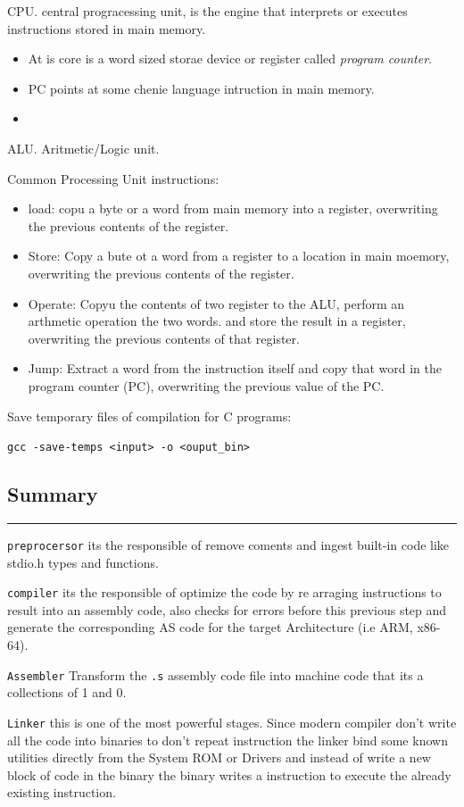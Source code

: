 CPU. central progracessing unit, is the engine that interprets or executes instructions stored in main memory.
\begin{itemize}
  \item At is core is a word sized storae device or register called \textit{program counter}.
  \item PC points at some chenie language intruction in main memory.
  \item 

\end{itemize}
ALU. Aritmetic/Logic unit.

Common Processing Unit instructions:
\begin{itemize}
  \item load: copu a byte or a word from main memory into a register, overwriting the previous contents of the register.
  \item Store: Copy a bute ot a word from a register to a location in main moemory, overwriting the previous contents of the register.
  \item Operate: Copyu the contents of two register to the ALU, perform an arthmetic operation the two words. and store the result in a register, overwriting the previous contents of that register.
  \item Jump: Extract a word from the instruction itself and copy that word in the program counter (PC), overwriting the previous value of the PC.


\end{itemize}
Save temporary files of compilation for C programs:

\texttt{gcc -save-temps \textless{}input\textgreater{} -o \textless{}ouput\_bin\textgreater{}}

\subsection{Summary}
\noindent\rule{\textwidth}{0.4pt}
\texttt{preprocersor} its the responsible of remove coments and ingest built-in code like stdio.h types and functions.

\texttt{compiler} its the responsible of optimize the code by re arraging instructions to result into an assembly code, also checks for errors before this previous step and generate the corresponding AS code for the target Architecture (i.e ARM, x86-64).

\texttt{Assembler} Transform the \texttt{.s} assembly code file into machine code that its a collections of 1 and 0.

\texttt{Linker} this is one of the most powerful stages. Since modern compiler don't write all the code into binaries to don't repeat instruction the linker bind some known utilities directly from the System ROM or Drivers and instead of write a new block of code in the binary the binary writes a instruction to execute the already existing instruction.


